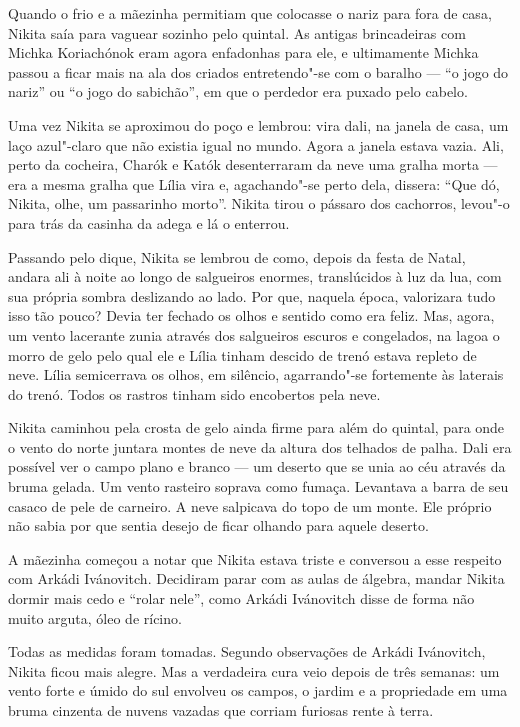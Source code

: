 Quando o frio e a mãezinha permitiam que colocasse o nariz para fora de
casa, Nikita saía para vaguear sozinho pelo quintal. As antigas brincadeiras
com Michka Koriachónok eram agora enfadonhas para ele, e ultimamente
Michka passou a ficar mais na ala dos criados entretendo"-se com o baralho --- ``o
jogo do nariz'' ou ``o jogo do sabichão'', em que o perdedor era puxado
pelo cabelo.

Uma vez Nikita se aproximou do poço e lembrou: vira dali, na janela de casa, um
laço azul"-claro que não existia igual no mundo. Agora a janela estava
vazia. Ali, perto da cocheira, Charók e Katók desenterraram da neve uma
gralha morta --- era a mesma gralha que Lília vira e, agachando"-se perto
dela, dissera: ``Que dó, Nikita, olhe, um passarinho morto''. Nikita
tirou o pássaro dos cachorros, levou"-o para trás da casinha da adega e
lá o enterrou.

Passando pelo dique, Nikita se lembrou de como, depois da festa de Natal, andara ali à noite ao longo de salgueiros enormes, translúcidos à luz da lua,
com sua própria sombra deslizando ao lado. Por que, naquela época,
valorizara tudo isso tão pouco? Devia ter fechado os olhos e sentido
como era feliz. Mas, agora, um vento lacerante zunia através dos
salgueiros escuros e congelados, na lagoa o morro de gelo pelo qual ele
e Lília tinham descido de trenó estava repleto de neve. Lília
semicerrava os olhos, em silêncio, agarrando"-se fortemente às laterais
do trenó. Todos os rastros tinham sido encobertos pela neve.

Nikita caminhou pela crosta de gelo ainda firme para além do quintal,
para onde o vento do norte juntara montes de neve da altura dos telhados
de palha. Dali era possível ver o campo plano e branco --- um deserto
que se unia ao céu através da bruma gelada. Um vento rasteiro soprava
como fumaça. Levantava a barra de seu casaco de pele de carneiro. A neve
salpicava do topo de um monte. Ele próprio não sabia por que sentia
desejo de ficar olhando para aquele deserto.

A mãezinha começou a notar que Nikita estava triste e conversou a esse
respeito com Arkádi Ivánovitch. Decidiram parar com as aulas de álgebra,
mandar Nikita dormir mais cedo e ``rolar nele'', como Arkádi Ivánovitch
disse de forma não muito arguta, óleo de rícino.

Todas as medidas foram tomadas. Segundo observações de Arkádi
Ivánovitch, Nikita ficou mais alegre. Mas a verdadeira cura veio depois
de três semanas: um vento forte e úmido do sul envolveu os campos, o
jardim e a propriedade em uma bruma cinzenta de nuvens vazadas que
corriam furiosas rente à terra.

